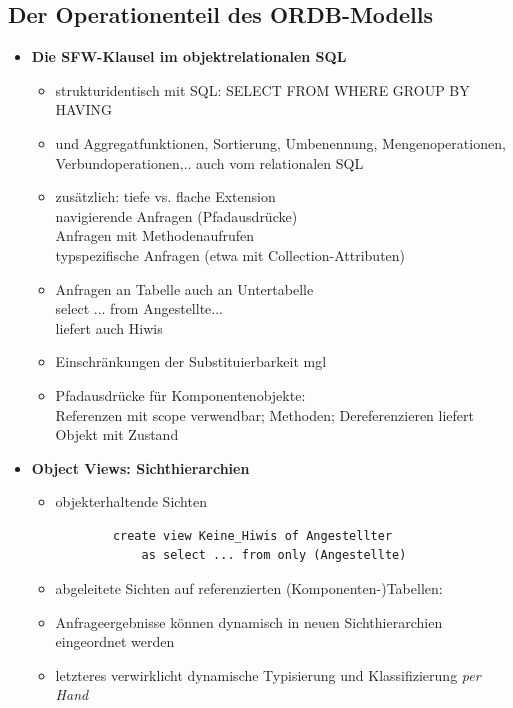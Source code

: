 \subsection{Der Operationenteil des ORDB-Modells}
\begin{itemize}
	\item \textbf{Die SFW-Klausel im objektrelationalen SQL}
	\begin{itemize}
		\item strukturidentisch mit SQL: SELECT FROM WHERE GROUP BY HAVING
		\item und Aggregatfunktionen, Sortierung, Umbenennung, Mengenoperationen, Verbundoperationen,.. auch vom relationalen SQL
		\item zusätzlich: tiefe vs. flache Extension\\
		navigierende Anfragen (Pfadausdrücke)\\
		Anfragen mit Methodenaufrufen\\
		typspezifische Anfragen (etwa mit Collection-Attributen)
		
		\item Anfragen an Tabelle auch an Untertabelle\\
		select ... from Angestellte...\\
		liefert auch Hiwis
		\item Einschränkungen der Substituierbarkeit mgl
		\item Pfadausdrücke für Komponentenobjekte:\\
		Referenzen mit scope verwendbar; Methoden; Dereferenzieren liefert Objekt mit Zustand
	\end{itemize}
	\item \textbf{Object Views: Sichthierarchien}
	\begin{itemize}
		\item objekterhaltende Sichten
		\begin{lstlisting}
		create view Keine_Hiwis of Angestellter
			as select ... from only (Angestellte)
		\end{lstlisting}
		\item abgeleitete Sichten auf referenzierten (Komponenten-)Tabellen:
		\item Anfrageergebnisse können dynamisch in neuen Sichthierarchien eingeordnet werden
		\item letzteres verwirklicht dynamische Typisierung und Klassifizierung \textit{per Hand}
	\end{itemize}
\end{itemize}


